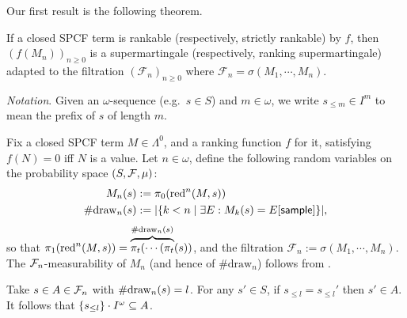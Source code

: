 \medskip

Our first result is the following theorem.
\begin{theorem}[Rankability] 
\label{thm:rankable and strict rankable}
If a closed SPCF term is rankable (respectively, strictly rankable) by $f$, then $(f(M_n))_{n \geq 0}$ is a 
supermartingale (respectively, ranking supermartingale) adapted to the filtration $(\mathcal{F}_n)_{n \geq 0}$ where $\mathcal{F}_n = \sigma(M_1, \cdots, M_n)$.
\end{theorem}


\emph{Notation}. Given an $\omega$-sequence (e.g.~$s \in S$) and $m \in \omega$, we write $s_{\leq m} \in I^m$ to mean the prefix of $s$ of length $m$.

Fix a closed SPCF term $M \in \Lambda^0$, and a ranking function $f$ for it, satisfying $f(N) = 0$ iff $N$ is a value.
Let $n \in \omega$, define the following random variables on the probability space $(S, \mathcal{F}, \mu)$:
\begin{align*}
M_n(s) &:= \pi_0 (\operatorname{red}^n(M, s))\\
\#\mathrm{draw}_{n}(s) &:= |\{k < n \mid \exists E: M_k(s) = E[\mathsf{sample}]\}|,
\end{align*}
 so that $\pi_1 (\operatorname{red}^n(M, s)) = \overbrace{\pi_t( \cdots (\pi_t}^{\#\mathrm{draw}_{n}(s)}(s))$, and the filtration $\mathcal{F}_n := \sigma(M_1, \cdots, M_n)$.
The $\mathcal{F}_n$-measurability of $M_n$ (and hence of $\#\mathrm{draw}_n$) follows from \citep{DBLP:conf/icfp/BorgstromLGS16}.
\iffalse
\akr{$\#\mathrm{draw}_n$ is not a stopping time. It doesn't look like you actually use this claim anyway, so it should just be fine to remove, but did you mean something different?} \lo{I agree, and I don't actually use this claim.}
\fi
Take $s \in A \in \mathcal{F}_n$ with $\#\mathrm{draw}_{n}(s) = l$.
For any $s'\in S$, if $s_{\leq l} = s_{\leq l}'$ then $s' \in A$.
It follows that ${\{s_{\leq l}\} \cdot I^\omega} \subseteq A$.

